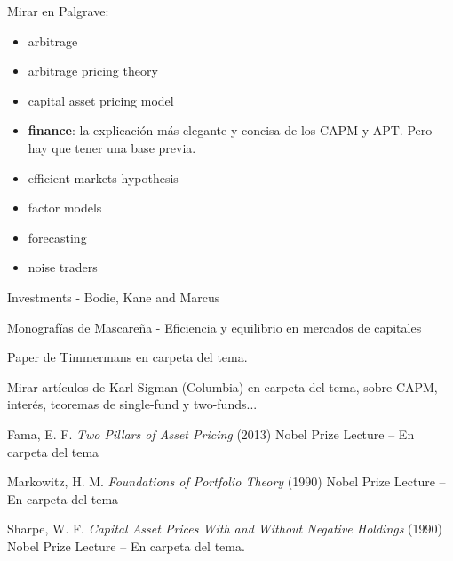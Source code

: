 \documentclass{nuevotema}
\begin{document}
Mirar en Palgrave:
\begin{itemize}
	\item arbitrage
	\item arbitrage pricing theory
    \item capital asset pricing model
    \item \textbf{finance}: la explicación más elegante y concisa de los CAPM y APT. Pero hay que tener una base previa.
    \item efficient markets hypothesis
    \item factor models
    \item forecasting
    \item noise traders
\end{itemize}

Investments - Bodie, Kane and Marcus

Monografías de Mascareña - Eficiencia y equilibrio en mercados de capitales

Paper de Timmermans en carpeta del tema.

Mirar artículos de Karl Sigman (Columbia) en carpeta del tema, sobre CAPM, interés, teoremas de single-fund y two-funds...

Fama, E. F. \textit{Two Pillars of Asset Pricing} (2013) Nobel Prize Lecture -- En carpeta del tema

Markowitz, H. M. \textit{Foundations of Portfolio Theory} (1990) Nobel Prize Lecture -- En carpeta del tema

Sharpe, W. F. \textit{Capital Asset Prices With and Without Negative Holdings} (1990) Nobel Prize Lecture -- En carpeta del tema.
\end{document}
